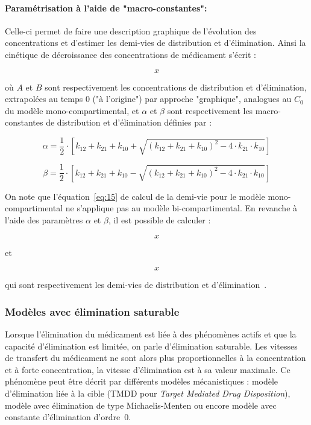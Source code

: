 \paragraph*{Paramétrisation à l'aide de "macro-constantes":} Celle-ci permet de faire une description graphique de l'évolution des concentrations et d'estimer les demi-vies de distribution et d'élimination. Ainsi la cinétique de décroissance des concentrations de médicament s'écrit :

\begin{equation}
x
\label{eq:28}
\end{equation}

où $A$ et $B$ sont respectivement les concentrations de distribution et d'élimination, extrapolées au temps $0$ ("à l'origine") par approche "graphique", analogues au $C_0$ du modèle mono-compartimental, et $\alpha$ et $\beta$ sont respectivement les macro-constantes de distribution et d'élimination définies par :

\begin{equation}
\alpha = \frac{1}{2}\cdot[k_{12}+k_{21}+k_{10}+\sqrt{(k_{12}+k_{21}+k_{10})^2-4\cdot k_{21}\cdot k_{10}}]
\label{eq:29}
\end{equation}

\begin{equation}
\beta = \frac{1}{2}\cdot[k_{12}+k_{21}+k_{10}-\sqrt{(k_{12}+k_{21}+k_{10})^2-4\cdot k_{21}\cdot k_{10}}]
\label{eq:30}
\end{equation}

On note que l'équation~\ref{eq:15} de calcul de la demi-vie pour le modèle mono-compartimental ne s'applique pas au modèle bi-compartimental. En revanche à l'aide des paramètres $\alpha$ et $\beta$, il est possible de calculer :

\begin{equation}
x
\label{eq:31}
\end{equation}

et

\begin{equation}
x
\label{eq:32}
\end{equation}

qui sont respectivement les demi-vies de distribution et d'élimination~\citep{REF2}.

\subsubsection{Modèles avec élimination saturable}
Lorsque l'élimination du médicament est liée à des phénomènes actifs et que la capacité d'élimination est limitée, on parle d'élimination saturable. Les vitesses de transfert du médicament ne sont alors plus proportionnelles à la concentration et à forte concentration, la vitesse d'élimination est à sa valeur maximale. Ce phénomène peut être décrit par différents modèles mécanistiques : modèle d'élimination liée à la cible (TMDD pour \textit{Target Mediated Drug Disposition}), modèle avec élimination de type Michaelis-Menten ou encore modèle avec constante d'élimination d'ordre~0. 

